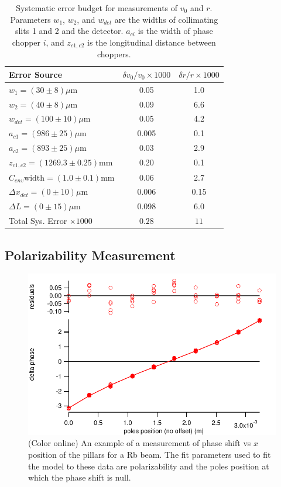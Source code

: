 \documentclass[twocolumn, prl,showpacs,superscriptaddress]{revtex4-1}   %
\newcommand{\sigv}{0.28}
\newcommand{\sigr}{11}
\begin{document}
\begingroup
\begin{table}
\caption{\label{tableVelError}Systematic error budget for measurements of $v_0$ and $r$. Parameters $w_1$, $w_2$, and $w_{det}$ are the widths of collimating slits 1 and 2 and the detector. $a_{ci}$ is the width of phase chopper $i$, and $z_{c1,c2}$ is the longitudinal distance between choppers.}
\begin{center}
\begin{tabular}{l c c}
\hline\hline
Error Source & $\delta v_0/v_0 \times 1000$ & $\delta r/r \times 1000$ \\
\hline
$w_1 = (30 \pm 8) \mu\mathrm{m}$ 		& 0.05 & 1.0 \\
$w_2 = (40 \pm 8) \mu\mathrm{m}$ 		& 0.09 & 6.6 \\
$w_{det} = (100 \pm 10) \mu\mathrm{m}$ 		& 0.05 & 4.2 \\
$a_{c1} = (986 \pm 25) \mu\mathrm{m}$ 		& 0.005 & 0.1 \\
$a_{c2} = (893 \pm 25) \mu\mathrm{m}$ 		& 0.03 & 2.9 \\
$z_{c1,c2} = (1269.3 \pm 0.25) \mathrm{mm}$ 		& 0.20 & 0.1 \\
$C_{env} \mathrm{width} = (1.0 \pm 0.1) \mathrm{mm}$ 		& 0.06 & 2.7 \\
$\Delta x_{det} = (0 \pm 10) \mu\mathrm{m}$ 		& 0.006 & 0.15 \\
$\Delta L = (0 \pm 15) \mu\mathrm{m}$		& 0.098 & 6.0 \\
\hline
Total Sys. Error $\times 1000$ & $\sigv$ & $\sigr$ \\
\hline\hline
\end{tabular}
\end{center}
\end{table}
\endgroup

\subsection{Polarizability Measurement}

\begin{figure}
\includegraphics[width=\linewidth,keepaspectratio]{dPvMP_150327_q.pdf}
\caption{\label{dPvMPExample}(Color online) An example of a measurement of phase shift vs $x$ position of the pillars for a Rb beam. The fit parameters used to fit the model to these data are polarizability and the poles position at which the phase shift is null.}
\end{figure}
\end{document}
